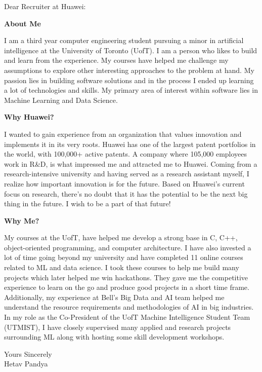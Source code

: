 \documentclass[a4paper,english]{friggeri-letter}
\begin{document}

\address{
   310 Bloor St W \\
   Toronto, ON, Canada
}





\opening{Dear Recruiter at Huawei:}

\textbf{About Me}

I am a third year computer engineering student pursuing a minor in artificial intelligence at the University of Toronto (UofT). I am a person who likes to build and learn from the experience. My courses have helped me challenge my assumptions to explore other interesting approaches to the problem at hand. My passion lies in building software solutions and in the process I ended up learning a lot of technologies and skills. My primary area of interest within software lies in Machine Learning and Data Science.

\textbf{Why Huawei?}

I wanted to gain experience from an organization that values innovation and implements it in its very roots. Huawei has one of the largest patent portfolios in the world, with 100,000+ active patents. A company where 105,000 employees work in R\&D, is what impressed me and attracted me to Huawei. Coming from a research-intensive university and having served as a research assistant myself, I realize how important innovation is for the future. Based on Huawei's current focus on research, there's no doubt that it has the potential to be the next big thing in the future. I wish to be a part of that future!

\textbf{Why Me?}

My courses at the UofT, have helped me develop a strong base in C, C++, object-oriented programming, and computer architecture. I have also invested a lot of time going beyond my university and have completed 11 online courses related to ML and data science. I took these courses to help me build many projects which later helped me win hackathons. They gave me the competitive experience to learn on the go and produce good projects in a short time frame. Additionally, my experience at Bell's Big Data and AI team helped me understand the resource requirements and methodologies of AI in big industries. In my role as the Co-President of the UofT Machine Intelligence Student Team (UTMIST), I have closely supervised many applied and research projects surrounding ML along with hosting some skill development workshops.

\vspace*{0.1cm}
\closing{
   Yours Sincerely\\
   Hetav Pandya}
\end{document}

